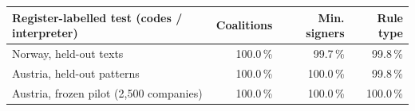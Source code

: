 \begin{tabular}{lrrr}
\toprule
Register-labelled test (codes / interpreter) & Coalitions & Min. signers & Rule type \\
\midrule
Norway, held-out texts & 100.0\,\% & 99.7\,\% & 99.8\,\% \\
Austria, held-out patterns & 100.0\,\% & 100.0\,\% & 99.8\,\% \\
Austria, frozen pilot (2,500 companies) & 100.0\,\% & 100.0\,\% & 100.0\,\% \\
\bottomrule
\end{tabular}

